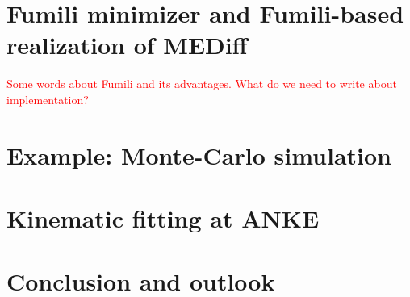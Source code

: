 \documentclass{webofc}
\begin{document}
\section{Fumili minimizer and Fumili-based realization of MEDiff}
\textcolor{red}{Some words about Fumili and its advantages.}
% 
\textcolor{red}{What do we need to write about implementation?}

\section{Example: Monte-Carlo simulation}

\section{Kinematic fitting at ANKE}

\section{Conclusion and outlook}


% 


\end{document}
